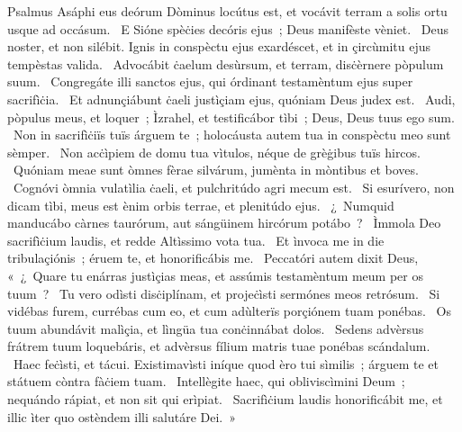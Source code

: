{ Psalmus Asáphi}
{%
eus deórum Dòminus locútus est, et vocávit terram a solis ortu usque ad occásum. 
~E Sióne spèċies decóris ejus~; Deus manifèste vèniet. 
~Deus noster, et non silébit. Ignis in conspèctu ejus exardéscet, et in çircùmitu ejus tempèstas valida. 
~Advocábit ċaelum desùrsum, et terram, disċèrnere pòpulum suum. 
~Congregáte illi sanctos ejus, qui órdinant testamèntum ejus super sacrifìċia. 
~Et adnunçiábunt ċaeli justìçiam ejus, quóniam Deus judex est. 
~Audi, pòpulus meus, et loquer~; Ìzrahel, et testificábor tìbi~; Deus, Deus tuus ego sum. 
~Non in sacrifìċiïs tuïs árguem te~; holocáusta autem tua in conspèctu meo sunt sèmper. 
~Non acċìpiem de domu tua vìtulos, néque de grèġibus tuïs hircos. 
~Quóniam meae sunt òmnes fèrae silvárum, jumènta in mòntibus et boves. 
~Cognóvi òmnia vulatìlia ċaeli, et pulchritúdo agri mecum est. 
~Si esurívero, non dicam tìbi, meus est ènim orbis terrae, et plenitúdo ejus. 
~¿~Numquid manducábo càrnes taurórum, aut sángüinem hircórum potábo~? 
~Ìmmola Deo sacrifìċium laudis, et redde Altìssimo vota tua. 
~Et ìnvoca me in die tribulaçiónis~; éruem te, et honorificábis me. 
~Peccatóri autem dixit Deus, «~¿~Quare tu enárras justìçias meas, et assúmis testamèntum meum per os tuum~? 
~Tu vero odìsti disċiplínam, et projeċìsti sermónes meos retrósum. 
~Si vidébas furem, currébas cum eo, et cum adùlterïs porçiónem tuam ponébas. 
~Os tuum abundávit malìçia, et lìngüa tua conċinnábat dolos. 
~Sedens advèrsus frátrem tuum loquebáris, et advèrsus fílium matris tuae ponébas scándalum. 
~Haec feċìsti, et tácui. Existimavìsti iníque quod èro tui sìmilis~; árguem te et státuem còntra fàċiem tuam. 
~Intellègite haec, qui obliviscìmini Deum~; nequándo rápiat, et non sit qui erìpiat. 
~Sacrifìċium laudis honorificábit me, et illic ìter quo ostèndem illi salutáre Dei.~»
}
